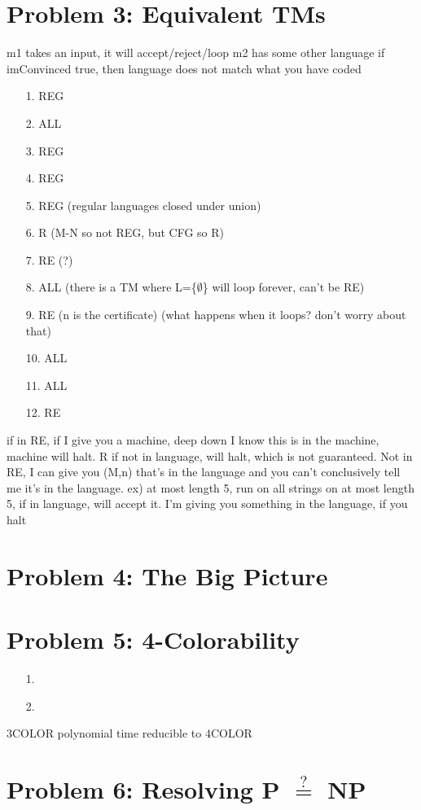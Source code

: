 \documentclass[10pt,letter]{article}
\begin{document}
\section*{Problem 3: Equivalent TMs}
m1 takes an input, it will accept/reject/loop
m2 has some other language
if imConvinced true, then language does not match what you have coded


\begin{enumerate}
\item[1.] REG
\item[2.] ALL
\item[3.] REG
\item[4.] REG
\item[5.] REG (regular languages closed under union)
\item[6.] R (M-N so not REG, but CFG so R)
\item[7.] RE (?)
\item[8.] ALL (there is a TM where L=\{$\emptyset$\} will loop forever, can't be RE)
\item[9.] RE (n is the certificate) (what happens when it loops? don't worry about that)
\item[10.] ALL
\item[11.] ALL
\item[12.] RE 
\end{enumerate}
if in RE, if I give you a machine, deep down I know this is in the machine, machine will halt. R if not in language, will halt, which is not guaranteed. Not in RE, I can give you (M,n) that's in the language and you can't conclusively tell me it's in the language. ex) at most length 5, run on all strings on at most length 5, if in language, will accept it. I'm giving you something in the language, if you halt

\section*{Problem 4: The Big Picture}

\section*{Problem 5: 4-Colorability}
\begin{enumerate}
\item[1.]
\item[2.]
\end{enumerate}
3COLOR polynomial time reducible to 4COLOR
\section*{Problem 6: Resolving P $\stackrel{?}{=}$ NP}
\end{document}
